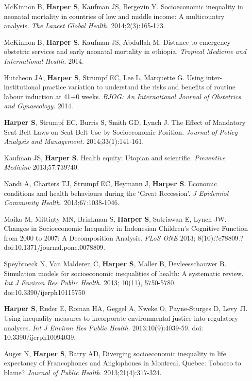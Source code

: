 \documentclass[
  letterpaper,
  DIV=11,
  numbers=noendperiod]{scrartcl}
\begin{document}
McKinnon B, \textbf{Harper S}, Kaufman JS, Bergevin Y. Socioeconomic
inequality in neonatal mortality in countries of low and middle income:
A multicountry analysis. \emph{The Lancet Global Health.}
2014;2(3):165-173.

McKinnon B, \textbf{Harper S}, Kaufman JS, Abdullah M. Distance to
emergency obstetric services and early neonatal mortality in ethiopia.
\emph{Tropical Medicine and International Health.} 2014.

Hutcheon JA, \textbf{Harper S}, Strumpf EC, Lee L, Marquette G. Using
inter-institutional practice variation to understand the risks and
benefits of routine labour induction at 41+0 weeks. \emph{BJOG: An
International Journal of Obstetrics and Gynaecology.} 2014.

\textbf{Harper S}, Strumpf EC, Burris S, Smith GD, Lynch J. The Effect
of Mandatory Seat Belt Laws on Seat Belt Use by Socioeconomic Position.
\emph{Journal of Policy Analysis and Management.} 2014;33(1):141-161.

Kaufman JS, \textbf{Harper S}. Health equity: Utopian and scientific.
\emph{Preventive Medicine} 2013;57:739?40.

Nandi A, Charters TJ, Strumpf EC, Heymann J, \textbf{Harper S}. Economic
conditions and health behaviours during the `Great Recession'. \emph{J
Epidemiol Community Health.} 2013;67:1038-1046.

Maika M, Mittinty MN, Brinkman S, \textbf{Harper S}, Satriawan E, Lynch
JW. Changes in Socioeconomic Inequality in Indonesian Children's
Cognitive Function from 2000 to 2007: A Decomposition Analysis.
\emph{PLoS ONE} 2013; 8(10):?e78809.?doi:10.1371/journal.pone.0078809.

Speybroeck N, Van Malderen C, \textbf{Harper S}, Maller B,
Devleesschauwer B. Simulation models for socioeconomic inequalities of
health: A systematic review. \emph{Int J Environ Res Public Health.}
2013; 10(11), 5750-5780. doi:10.3390/ijerph10115750

\textbf{Harper S}, Ruder E, Roman HA, Geggel A, Nweke O, Payne-Sturges
D, Levy JI. Using inequality measures to incorporate environmental
justice into regulatory analyses. \emph{Int J Environ Res Public
Health.} 2013;10(9):4039-59. doi: 10.3390/ijerph10094039.

Auger N, \textbf{Harper S}, Barry AD, Diverging socioeconomic inequality
in life expectancy of Francophones and Anglophones in Montreal, Quebec:
Tobacco to blame? \emph{Journal of Public Health.} 2013;21(4):317-324.
\end{document}
